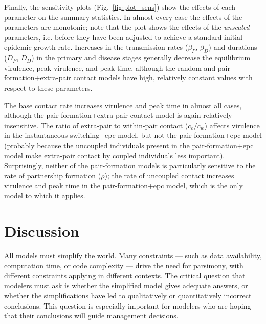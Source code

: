 \documentclass[10pt,letterpaper]{article}
\begin{document}
Finally, the sensitivity plots (Fig.~\ref{fig:plot_sens}) show the effects 
of each parameter on the summary statistics. In almost every case the
effects of the parameters are monotonic; note that
the plot shows the effects of the \emph{unscaled} parameters, i.e.
before they have been adjusted to achieve a standard initial epidemic
growth rate.
Increases in the transmission rates ($\beta_P$, $\beta_D$)
and durations ($D_P$, $D_D$) in the primary and disease stages generally
decrease the equilibrium virulence, peak virulence, and peak time,
although the random and pair-formation+extra-pair contact
models have high, relatively
constant values with respect to these parameters. 

The base contact rate increases virulence and peak time in almost all
cases, although the pair-formation+extra-pair contact
model is again relatively insensitive.
The ratio of extra-pair to within-pair contact ($c_e/c_w$) affects
virulence in the instantaneous-switching+epc model, but not the pair-formation+epc
model (probably because the uncoupled individuals present in the pair-formation+epc
model make extra-pair contact by coupled individuals less important).
Surprisingly, neither of the pair-formation models is particularly sensitive to the 
rate of partnership formation ($\rho$); the rate of uncoupled contact
increases virulence and peak time in the pair-formation+epc model, 
which is the only model to which it applies.

\section*{Discussion}

All models must simplify the world.  Many constraints --- such as data
availability, computation time, or code complexity --- drive the need
for parsimony, with different constraints applying in different
contexts. The critical question that modelers must ask is whether the
simplified model gives adequate answers, or whether the
simplifications have led to qualitatively or quantitatively incorrect
conclusions.  This question is especially important for modelers who
are hoping that their conclusions will guide management decisions.
\end{document}
